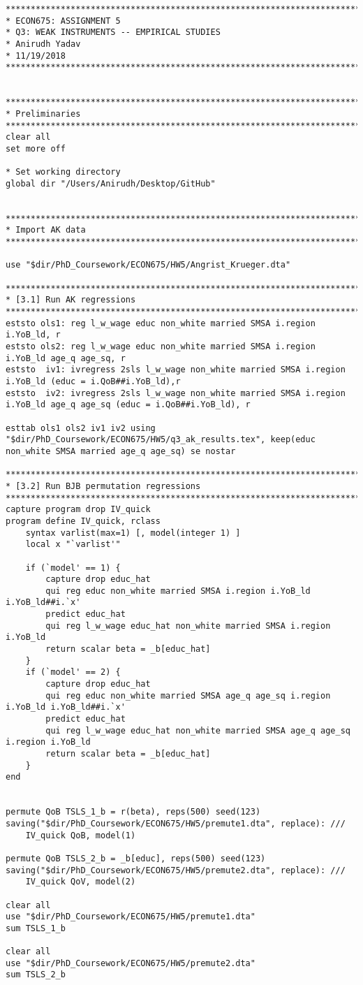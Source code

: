 \documentclass[12pt]{article}
\begin{document}
\begin{verbatim}
********************************************************************************
* ECON675: ASSIGNMENT 5
* Q3: WEAK INSTRUMENTS -- EMPIRICAL STUDIES
* Anirudh Yadav
* 11/19/2018
********************************************************************************


********************************************************************************
* Preliminaries
********************************************************************************
clear all
set more off

* Set working directory 
global dir "/Users/Anirudh/Desktop/GitHub"


********************************************************************************
* Import AK data
********************************************************************************

use "$dir/PhD_Coursework/ECON675/HW5/Angrist_Krueger.dta"

********************************************************************************
* [3.1] Run AK regressions
********************************************************************************
eststo ols1: reg l_w_wage educ non_white married SMSA i.region i.YoB_ld, r
eststo ols2: reg l_w_wage educ non_white married SMSA i.region i.YoB_ld age_q age_sq, r
eststo  iv1: ivregress 2sls l_w_wage non_white married SMSA i.region i.YoB_ld (educ = i.QoB##i.YoB_ld),r
eststo  iv2: ivregress 2sls l_w_wage non_white married SMSA i.region i.YoB_ld age_q age_sq (educ = i.QoB##i.YoB_ld), r

esttab ols1 ols2 iv1 iv2 using "$dir/PhD_Coursework/ECON675/HW5/q3_ak_results.tex", keep(educ non_white SMSA married age_q age_sq) se nostar

********************************************************************************
* [3.2] Run BJB permutation regressions
********************************************************************************
capture program drop IV_quick
program define IV_quick, rclass
    syntax varlist(max=1) [, model(integer 1) ]
	local x "`varlist'"
	
	if (`model' == 1) {
	    capture drop educ_hat
		qui reg educ non_white married SMSA i.region i.YoB_ld i.YoB_ld##i.`x'
		predict educ_hat
		qui reg l_w_wage educ_hat non_white married SMSA i.region i.YoB_ld
		return scalar beta = _b[educ_hat]
	}
	if (`model' == 2) {
	    capture drop educ_hat
		qui reg educ non_white married SMSA age_q age_sq i.region i.YoB_ld i.YoB_ld##i.`x'
		predict educ_hat
		qui reg l_w_wage educ_hat non_white married SMSA age_q age_sq i.region i.YoB_ld
		return scalar beta = _b[educ_hat]
	}
end


permute QoB TSLS_1_b = r(beta), reps(500) seed(123) saving("$dir/PhD_Coursework/ECON675/HW5/premute1.dta", replace): ///
    IV_quick QoB, model(1)
	
permute QoB TSLS_2_b = _b[educ], reps(500) seed(123) saving("$dir/PhD_Coursework/ECON675/HW5/premute2.dta", replace): ///
    IV_quick QoV, model(2)

clear all
use "$dir/PhD_Coursework/ECON675/HW5/premute1.dta"
sum TSLS_1_b

clear all
use "$dir/PhD_Coursework/ECON675/HW5/premute2.dta"
sum TSLS_2_b
\end{verbatim}
\end{document}
